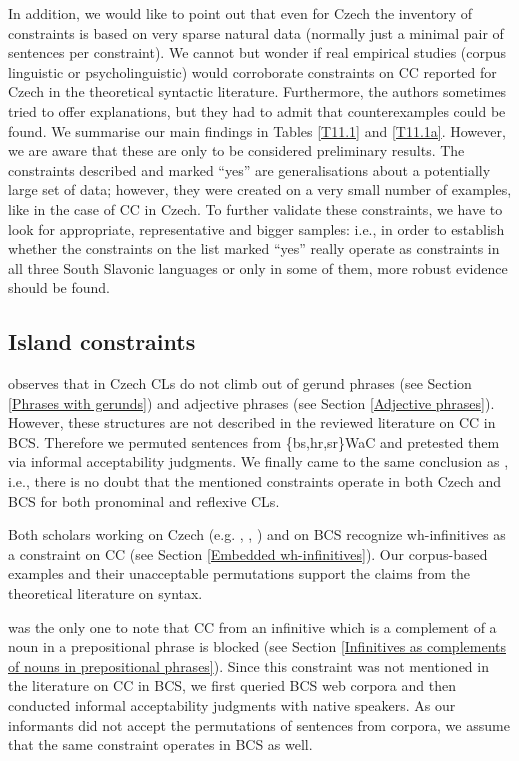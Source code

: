 In addition, we would like to point out that even for Czech the inventory of constraints is based on very sparse natural data (normally just a minimal pair of sentences per constraint). We cannot but wonder if real empirical studies (corpus linguistic or psycholinguistic) would corroborate constraints on CC reported for Czech in the theoretical syntactic literature. Furthermore, the authors sometimes tried to offer explanations, but they had to admit that counterexamples could be found. We summarise our main findings in Tables \ref{T11.1} and \ref{T11.1a}. However, we are aware that these are only to be considered preliminary results. The constraints described and marked “yes” are generalisations about a potentially large set of data; however, they were created on a very small number of examples, like in the case of CC in Czech. To further validate these constraints, we have to look for appropriate, representative and bigger samples: i.e., in order to establish whether the constraints on the list marked “yes” really operate as constraints in all three South Slavonic languages or only in some of them, more robust evidence should be found. 


\subsection{Island constraints}


\citet{Junghanns02} observes that in Czech CLs do not climb out of gerund phrases (see Section \ref{Phrases with gerunds}) and adjective phrases (see Section \ref{Adjective phrases}). However, these structures are not described in the reviewed literature on CC in BCS. Therefore we permuted sentences from \{bs,hr,sr\}WaC and pretested them via informal acceptability judgments. We finally came to the same conclusion as \citet{Junghanns02}, i.e., there is no doubt that the mentioned constraints operate in both Czech and BCS for both pronominal and reflexive CLs. 

Both scholars working on Czech (e.g. \citealt{Junghanns02}, \citealt{Dotlacil04}, \citealt{Rezac05}) and on BCS \citep[e.g.][]{ Aljovic05} recognize wh-infinitives as a constraint on CC (see Section \ref{Embedded wh-infinitives}). Our corpus-based examples and their unacceptable permutations support the claims from the theoretical literature on syntax. 

\citet{Junghanns02} was the only one to note that CC from an infinitive which is a complement of a noun in a prepositional phrase is blocked (see Section \ref{Infinitives as complements of nouns in prepositional phrases}). Since this constraint was not mentioned in the literature on CC in BCS, we first queried BCS web corpora and then conducted informal acceptability judgments with native speakers. As our informants did not accept the permutations of sentences from corpora, we assume that the same constraint operates in BCS as well. 


